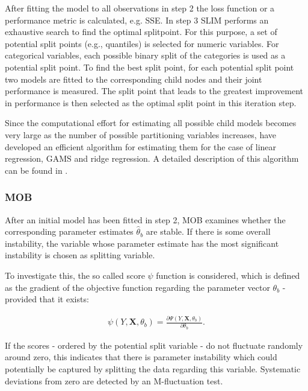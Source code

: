 After fitting the model to all observations in step 2 the loss function or a performance metric is calculated, e.g. SSE.
In step 3 SLIM performs an exhaustive search to find the optimal splitpoint.  
For this purpose, a set of potential split points (e.g., quantiles) is selected for numeric variables. For categorical variables, each possible binary split of the categories is used as a potential split point.
To find the best split point, for each potential split point two models are fitted to the corresponding child nodes and their joint performance is measured. The split point that leads to the greatest improvement in performance is then selected as the optimal split point in this iteration step.

Since the computational effort for estimating all possible child models becomes very large as the number of possible partitioning variables increases, \citep{Hu.2020} have developed an efficient algorithm for estimating them for the case of linear regression, GAMS and ridge regression. A detailed description of this algorithm can be found in \citep{Hu.2020}.










\subsubsection{MOB}
After an initial model has been fitted in step 2, MOB examines whether the corresponding parameter estimates $\hat{\theta}_b$ are stable. If there is some overall instability, the variable whose parameter estimate has the most significant instability is  chosen as splitting variable.

To investigate this, the so called score $\psi$ function is considered, which is defined as the
gradient of the objective function regarding the parameter vector $\theta_b$ - provided that it exists:

\begin{align}
    \psi(Y, \mathbf{X}, \theta_b) = \frac{\partial \Psi(Y, \mathbf{X}, \theta_b)}{\partial \theta_b}.
\end{align}

\citep{Zeileis.2008}

If the scores - ordered by the potential split variable - do not fluctuate randomly around zero, this indicates that there is parameter instability which could potentially be captured by splitting the data regarding this variable.\citep{Schlosser.2019}
Systematic deviations from zero are detected by an M-fluctuation test.  \citep{Zeileis.2008}




